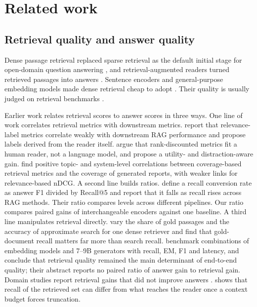 \section{Related work}\label{sec:related}

\subsection{Retrieval quality and answer quality}
Dense passage retrieval replaced sparse retrieval as the default initial stage for open-domain question answering \citep{karpukhin2020dpr,lee2019orqa}, and retrieval-augmented readers turned retrieved passages into answers \citep{lewis2020rag,izacard2021fid}. Sentence encoders and general-purpose embedding models made dense retrieval cheap to adopt \citep{reimers2019sbert,wang2022e5,xiao2024cpack,zhang2025qwen3emb}. Their quality is usually judged on retrieval benchmarks \citep{thakur2021beir,muennighoff2023mteb}.

Earlier work relates retrieval scores to answer scores in three ways. One line of work correlates retrieval metrics with downstream metrics. \citet{salemi2024erag} report that relevance-label metrics correlate weakly with downstream RAG performance and propose labels derived from the reader itself. \citet{trappolini2025udcg} argue that rank-discounted metrics fit a human reader, not a language model, and propose a utility- and distraction-aware gain. \citet{samuel2026beyond} find positive topic- and system-level correlations between coverage-based retrieval metrics and the coverage of generated reports, with weaker links for relevance-based nDCG. A second line builds ratios. \citet{peng2026neocorrag} define a recall conversion rate as answer F1 divided by Recall@5 and report that it falls as recall rises across RAG methods. Their ratio compares levels across different pipelines. Our ratio compares paired gains of interchangeable encoders against one baseline. A third line manipulates retrieval directly. \citet{leto2024toward} vary the share of gold passages and the accuracy of approximate search for one dense retriever and find that gold-document recall matters far more than search recall. \citet{hitl2026comparative} benchmark combinations of embedding models and 7--9B generators with recall, EM, F1 and latency, and conclude that retrieval quality remained the main determinant of end-to-end quality; their abstract reports no paired ratio of answer gain to retrieval gain. Domain studies report retrieval gains that did not improve answers \citep{mathur2026policy,medrano2026fusion,muthyam2026systems,ghosh2026evidence}. \citet{bala2026recall} shows that recall of the retrieved set can differ from what reaches the reader once a context budget forces truncation.

